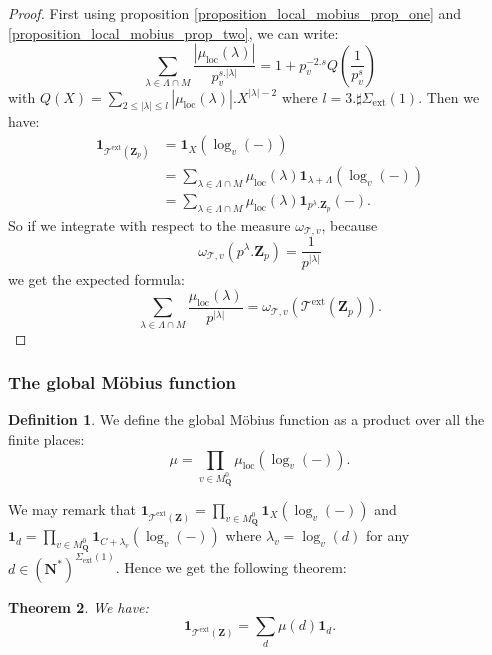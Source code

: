 \documentclass{proc-l}
\newcommand{\Z}{\mathbf{Z}}
\newcommand{\N}{\mathbf{N}}
\newcommand{\Q}{\mathbf{Q}}
\DeclareMathOperator{\loc}{loc}
\DeclareMathOperator{\ext}{ext}
\newcommand{\stackT}{\mathcal{T}}
\newcommand{\w}{\omega}
\newtheorem{theorem}{Theorem}[section]
\theoremstyle{definition}
\newtheorem{definition}[theorem]{Definition}
\theoremstyle{remark}
\numberwithin{equation}{section}
\begin{document}
\begin{proof}
    First using proposition \ref{proposition_local_mobius_prop_one} and \ref{proposition_local_mobius_prop_two}, we can write:
$$\sum\limits_{\lambda \in \Lambda \cap M} \frac{|\mu_{\loc}(\lambda)|}{p_v^{s.|\lambda|}} = 1 + p_v^{-2.s} Q(\frac{1}{p_v^s}) $$ with $Q(X) = \sum\limits_{2 \leqslant |\lambda| \leqslant l} | \mu_{\loc}(\lambda) |.X^{|\lambda|-2} $ where $l = 3. \sharp \Sigma_{\ext}(1)$. Then we have:
    \begin{align*}
        \mathbf{1}_{\stackT^{\ext}(\Z_p)} &= \mathbf{1}_X(\log_v(-)) \\
    &= \sum\limits_{\lambda \in \Lambda \cap M} \mu_{\loc}(\lambda) \mathbf{1}_{\lambda + \Lambda}(\log_v(-)) \\
    &= \sum\limits_{\lambda \in \Lambda \cap M} \mu_{\loc}(\lambda) \mathbf{1}_{p^{\lambda} . \Z_p}(-) .
    \end{align*}So if we integrate with respect to the measure $\w_{\stackT,v}$, because $$\w_{\stackT,v}(p^{\lambda} . \Z_p) = \frac{1}{p^{|\lambda|}}$$we get the expected formula:
    $$\sum\limits_{\lambda \in \Lambda \cap M} \frac{\mu_{\loc}(\lambda)}{p^{|\lambda|}} = \w_{\stackT,v}(\stackT^{\ext}(\Z_p)) .$$
\end{proof}

\subsubsection{The global Möbius function}

\begin{definition}
    We define the global Möbius function as a product over all the finite places:
    $$\mu = \prod\limits_{v \in M_{\Q}^0} \mu_{\loc}(\log_v(-)) .$$
\end{definition}

We may remark that $\mathbf{1}_{\stackT^{\ext}(\Z)} = \prod\limits_{v \in M_{\Q}^0} \mathbf{1}_X(\log_v(-))$ and $\mathbf{1}_{d} = \prod\limits_{v \in M_{\Q}^0} \mathbf{1}_{C + \lambda_v}(\log_v(-))$ where $\lambda_v = \log_v(d)$ for any $d \in (\N^*)^{\Sigma_{\ext}(1)}$. Hence we get the following theorem:

\begin{theorem}\label{theorem_mobius_inversion}
    We have:
    $$\mathbf{1}_{\stackT^{\ext}(\Z)} = \sum\limits_d \mu(d) \mathbf{1}_{d} .$$
\end{theorem}
\end{document}
